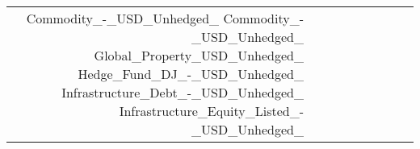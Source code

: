 \begin{tabular}{lrrrrrrrrr}
 & Commodity_-_USD_Unhedged_%
Commodity_-_USD_Unhedged_%
Global_Property_USD_Unhedged_%
Hedge_Fund_DJ_-_USD_Unhedged_%
Infrastructure_Debt_-_USD_Unhedged_%
Infrastructure_Equity_Listed_-_USD_Unhedged_%

\end{tabular}
